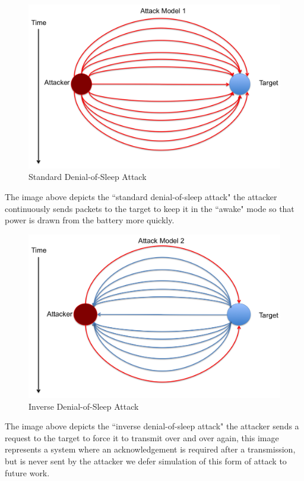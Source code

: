 \begin{figure}[H]
\caption{Standard Denial-of-Sleep Attack}
\includegraphics[width = \linewidth]{Figures/AModel1.png}
\end{figure}

The image above depicts the ``standard denial-of-sleep attack" the attacker continuously sends packets to the target to keep it in the ``awake" mode so that power is drawn from the battery more quickly.

\begin{figure}[H]
\caption{Inverse Denial-of-Sleep Attack}
\includegraphics[width = \linewidth]{Figures/AModel2.png}
\end{figure}

The image above depicts the ``inverse denial-of-sleep attack" the attacker sends a request to the target to force it to transmit over and over again, this image represents a system where an acknowledgement is required after a transmission, but is never sent by the attacker we defer simulation of this form of attack to future work.

